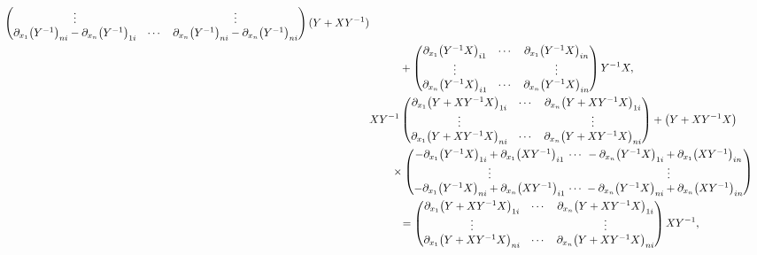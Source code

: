\documentclass[10pt,a4paper]{amsart}
\numberwithin{equation}{section}
\begin{document}
\begin{align}
\begin{pmatrix}
\vdots & & \vdots \\
\partial_{x_1}\bigl(Y^{-1}\bigr)_{ni}-\partial_{x_n}\bigl(Y^{-1}\bigr)_{1i} & \cdots & \partial_{x_n}\bigl(Y^{-1}\bigr)_{ni}-\partial_{x_n}\bigl(Y^{-1}\bigr)_{ni}
\end{pmatrix}
(Y+XY^{-1})\nonumber \\
&\phantom{\qquad=}{}+
\begin{pmatrix}
\partial_{x_1}\bigl(Y^{-1}X\bigr)_{i1} & \cdots & \partial_{x_1}\bigl(Y^{-1}X\bigr)_{in} \\
\vdots & & \vdots \\
\partial_{x_n}\bigl(Y^{-1}X\bigr)_{i1} & \cdots & \partial_{x_n}\bigl(Y^{-1}X\bigr)_{in}
\end{pmatrix}
Y^{-1}X, \label{K4}
\\
& XY^{-1}
\begin{pmatrix}
\partial_{x_1}\bigl(Y+XY^{-1}X\bigr)_{1i} & \cdots & \partial_{x_n}\bigl(Y+XY^{-1}X\bigr)_{1i} \\
\vdots & & \vdots \\
\partial_{x_1}\bigl(Y+XY^{-1}X\bigr)_{ni} & \cdots & \partial_{x_n}\bigl(Y+XY^{-1}X\bigr)_{ni}
\end{pmatrix}+\bigl(Y+XY^{-1}X\bigr)\nonumber \\
&\qquad\times
\begin{pmatrix}
-\partial_{x_1}\bigl(Y^{-1}X\bigr)_{1i}+\partial_{x_1}\bigl(XY^{-1}\bigr)_{i1} & {\hspace*{-3mm}}\cdots & {\hspace*{-3mm}}-\partial_{x_n}\bigl(Y^{-1}X\bigr)_{1i}+\partial_{x_1}\bigl(XY^{-1}\bigr)_{in} \\
\vdots & & \vdots \\
-\partial_{x_1}\bigl(Y^{-1}X\bigr)_{ni}+\partial_{x_n}\bigl(XY^{-1}\bigr)_{i1} & {\hspace*{-3mm}}\cdots & {\hspace*{-3mm}}-\partial_{x_n}\bigl(Y^{-1}X\bigr)_{ni}+\partial_{x_n}\bigl(XY^{-1}\bigr)_{in}
\end{pmatrix}\nonumber \\
&\phantom{\qquad+}{}=\begin{pmatrix}
\partial_{x_1}\bigl(Y+XY^{-1}X\bigr)_{1i} & \cdots & \partial_{x_n}\bigl(Y+XY^{-1}X\bigr)_{1i} \\
\vdots & & \vdots \\
\partial_{x_1}\bigl(Y+XY^{-1}X\bigr)_{ni} & \cdots & \partial_{x_n}\bigl(Y+XY^{-1}X\bigr)_{ni}
\end{pmatrix}
XY^{-1},\label{K5}
\\

\end{align}
\end{document}
